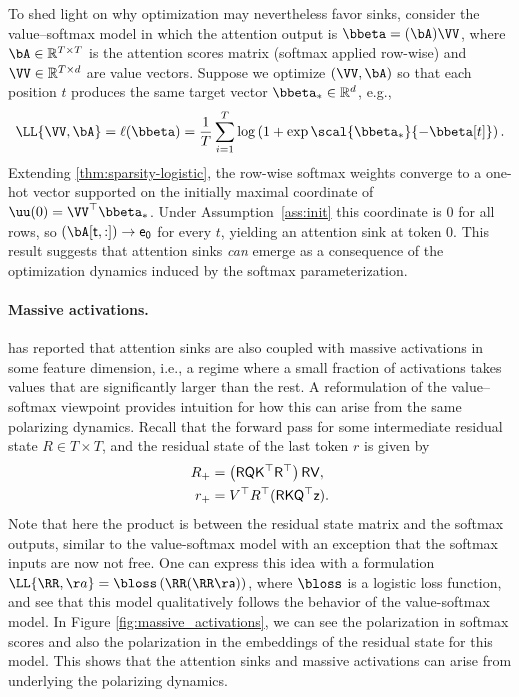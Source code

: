 \documentclass{article}
\theoremstyle{plain}
\theoremstyle{definition}
\theoremstyle{remark}
\begin{document}
To shed light on why optimization may nevertheless favor sinks, consider the value--softmax model in which the attention output is
$\bbeta = \sf(\bA)\VV$, where $\bA\in\mathbb{R}^{T\times T}$ is the attention scores matrix (softmax applied row-wise) and $\VV\in\mathbb{R}^{T\times d}$ are value vectors.
Suppose we optimize $(\VV,\bA)$ so that each position $t$ produces the same target vector $\bbeta_*\in\mathbb{R}^d$, e.g.,
\begin{align*}
  \LL{\VV, \bA} = \ell(\bbeta) = \frac{1}{T} \sum_{i=1}^{T} \log\left( 1 + \exp\scal{\bbeta_*}{- \bbeta[t]} \right).
\end{align*}
Extending \cref{thm:sparsity-logistic}, the row-wise softmax weights converge to a one-hot vector supported on the initially maximal coordinate of $\uu(0)=\VV^\top\bbeta_*$.
Under Assumption~\ref{ass:init} this coordinate is $0$ for all rows, so $\sf(\bA[t,:])\to e_0$ for every $t$, yielding an attention sink at token $0$. This result suggests that attention sinks \emph{can} emerge as a consequence of the optimization dynamics induced by the softmax parameterization.
%
%

\paragraph{Massive activations.} 
%
\citet{sun2024massive} has reported that attention sinks are also coupled with massive activations in some feature dimension, i.e., a regime where a small fraction of activations takes values that are significantly larger than the rest.
%
A reformulation of the value--softmax viewpoint provides intuition for how this can arise from the same polarizing dynamics.
% 
Recall that the forward pass for some intermediate residual state $R \in T \times T$, and the residual state of the last token $r$ is given by 
\begin{align*}
  R_{+} &=   \sf\left( R  QK^{\top} R^{\top} \right) R V, \\
  r_{+} &=  V^{\top} R^{\top} \sf( RKQ^{\top}z). 
\end{align*}
Note that here the product is between the residual state matrix and the softmax outputs, similar to the value-softmax model with an exception that the softmax inputs are now not free. One can express this idea with a formulation
$\LL{\RR, \aa}= \bloss\left( \RR \sf(\RR \aa) \right)$, where $\bloss$ is a logistic loss function, and see that this model qualitatively follows the behavior of the value-softmax model. 
In Figure \ref{fig:massive_activations}, we can see the polarization in softmax scores and also the polarization in the embeddings of the residual state for this model. This shows that the attention sinks and massive activations  can arise from underlying the polarizing dynamics. 
\end{document}
